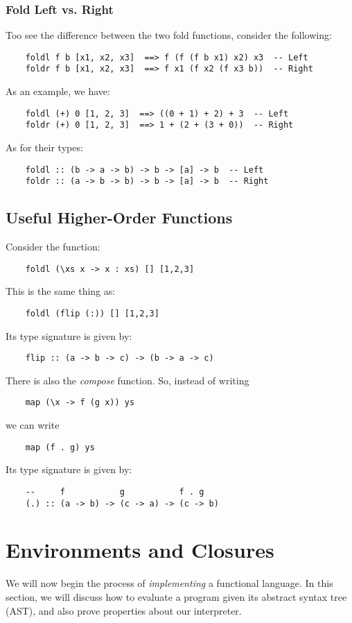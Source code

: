 \documentclass[letterpaper]{article}
\begin{document}
\subsubsection{Fold Left vs. Right}
Too see the difference between the two fold functions, consider the following: 
\begin{verbatim}
    foldl f b [x1, x2, x3]  ==> f (f (f b x1) x2) x3  -- Left
    foldr f b [x1, x2, x3]  ==> f x1 (f x2 (f x3 b))  -- Right\end{verbatim}
As an example, we have: 
\begin{verbatim}
    foldl (+) 0 [1, 2, 3]  ==> ((0 + 1) + 2) + 3  -- Left
    foldr (+) 0 [1, 2, 3]  ==> 1 + (2 + (3 + 0))  -- Right\end{verbatim}
As for their types: 
\begin{verbatim}    
    foldl :: (b -> a -> b) -> b -> [a] -> b  -- Left
    foldr :: (a -> b -> b) -> b -> [a] -> b  -- Right\end{verbatim}


\subsection{Useful Higher-Order Functions}
Consider the function:
\begin{verbatim}
    foldl (\xs x -> x : xs) [] [1,2,3]\end{verbatim}
This is the same thing as:
\begin{verbatim}
    foldl (flip (:)) [] [1,2,3]\end{verbatim}
Its type signature is given by: 
\begin{verbatim}
    flip :: (a -> b -> c) -> (b -> a -> c)\end{verbatim}

There is also the \emph{compose} function. So, instead of writing 
\begin{verbatim}
    map (\x -> f (g x)) ys\end{verbatim}
we can write 
\begin{verbatim}
    map (f . g) ys\end{verbatim}
Its type signature is given by: 
\begin{verbatim}
    --     f           g           f . g
    (.) :: (a -> b) -> (c -> a) -> (c -> b)\end{verbatim}



\newpage 
\section{Environments and Closures}
We will now begin the process of \emph{implementing} a functional language. In this section, we will discuss how to evaluate a program given its abstract syntax tree (AST), and also prove properties about our interpreter.
\end{document}
